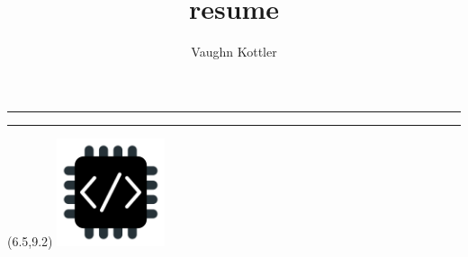 \documentclass[letterpaper,10pt]{article}
\title{resume}
\author{Vaughn Kottler}
\newcommand{\HR}{{\centering\noindent\rule{7.75in}{0.5pt}}\break}
\begin{document}
%
\noindent
\noindent
\noindent
\HR

\noindent
\noindent
\HR
%
\begin{textblock}{1.25}(6.5,9.2)
\includegraphics[width=1.25in,natwidth=100,natheight=100]{im/logo_500.png}
\end{textblock}
\noindent

\end{document}
